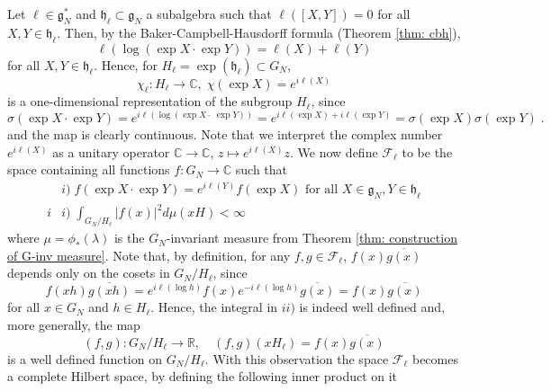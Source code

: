 \documentclass[pdflatex,sn-mathphys-num]{sn-jnl}
\theoremstyle{thmstyletwo}
\theoremstyle{thmstyleone}
\theoremstyle{thmstyletwo}
\newcommand{\fancyh}{\mathfrak{h}}
\newcommand{\fancyg}{\mathfrak{g}}
\newcommand{\C}{\mathbb{C}}
\begin{document}
	Let $\ell\in \fancyg_N^*$ and $\mathfrak{h}_\ell \subset \mathfrak{g}_N$ a subalgebra such that $\ell([X,Y]) = 0$ for all $X,Y \in \mathfrak{h}_{\ell}$. Then, by the Baker-Campbell-Hausdorff formula (Theorem \ref{thm: cbh}),
	\begin{equation*}
		\ell\left(\log(\operatorname{exp}X \cdot \operatorname{exp} Y)\right)  =  \ell(X) + \ell(Y)
	\end{equation*}
	for all $X,Y \in \mathfrak{h}_\ell$. Hence, for $H_\ell = \operatorname{exp}(\mathfrak{h}_\ell) \subset G_N$, 
	\[\chi_{\ell}: H_\ell \to \mathbb{C}, \; \chi(\operatorname{exp}X) = e^{i\ell(X)}\]
	is a one-dimensional representation of the subgroup $H_\ell$, since
	\begin{equation*}
		\sigma(\exp X \cdot \exp Y) = e^{i\ell\left(\log(\operatorname{exp}X\cdot \; \operatorname{exp} Y)\right)} = e^{i\ell(\operatorname{exp}X) + i\ell(\operatorname{exp}Y)} = \sigma(\exp X) \sigma(\exp Y) \;.
	\end{equation*}
	and the map is clearly continuous. Note that we interpret the complex number $e^{i\ell(X)}$ as a unitary operator $\C \to \C$, $z \mapsto e^{i\ell(X)}z$.
	We now define $\mathcal{F}_{\ell}$ to be the space containing all functions $f: G_N \to \mathbb{C}$ such that 
	\begin{align*}
		&i)\; f(\exp X \cdot \exp Y) = e^{i\ell(Y)}f(\exp X) \text{ for all } X \in \fancyg_N, Y \in \fancyh_{\ell} \\
		i&i) \;\int_{G_N/H_{\ell}} |f(x)|^2 d\mu(xH) < \infty
	\end{align*}
	where $\mu = \phi_*(\lambda)$ is the $G_N$-invariant measure from Theorem \ref{thm: construction of G-inv measure}. Note that, by definition, for any $f, g \in \mathcal{F}_{\ell}$, 
	$f(x)\overline{g(x)}$ depends only on the cosets in $G_N/H_{\ell}$, since
	\begin{equation*}
		f(xh)\overline{g(xh)} =  e^{i\ell(\log h)}f(x)e^{-i\ell(\log h)}\overline{g(x)} = f(x)\overline{g(x)}
	\end{equation*}
	for all $x \in G_N$ and $h \in H_{\ell}$. Hence, the integral in $ii)$ is indeed well defined and, more generally, the map 
	\begin{equation*}
		(f,g): G_N/H_{\ell} \to \mathbb{R}, \quad (f,g)(xH_{\ell}) =f(x)\overline{g(x)}
	\end{equation*}
	is a well defined function on $G_N/H_{\ell}$. With this observation the space $\mathcal{F}_{\ell}$ becomes a complete Hilbert space, by defining the following inner product on it \cite[Chapter~6]{folland2015course}
\end{document}
